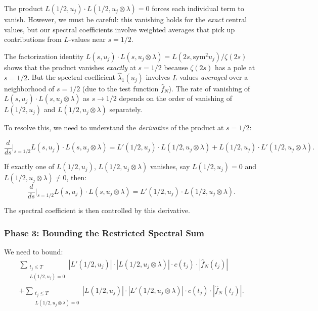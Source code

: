 \documentclass[11pt,a4paper]{article}
\theoremstyle{plain}
\theoremstyle{definition}
\newcommand{\sym}{\mathrm{sym}}
\begin{document}
The product $L(1/2, u_j) \cdot L(1/2, u_j \otimes \lambda) = 0$ forces each individual term to vanish. However, we must be careful: this vanishing holds for the \emph{exact} central values, but our spectral coefficients involve weighted averages that pick up contributions from $L$-values near $s = 1/2$.

\begin{obstacle}
The factorization identity $L(s, u_j) \cdot L(s, u_j \otimes \lambda) = L(2s, \sym^2 u_j)/\zeta(2s)$ shows that the product vanishes \emph{exactly} at $s = 1/2$ because $\zeta(2s)$ has a pole at $s = 1/2$. But the spectral coefficient $\hat{\lambda}_1(u_j)$ involves $L$-values \emph{averaged} over a neighborhood of $s = 1/2$ (due to the test function $\hat{f}_N$). The rate of vanishing of $L(s, u_j) \cdot L(s, u_j \otimes \lambda)$ as $s \to 1/2$ depends on the order of vanishing of $L(1/2, u_j)$ and $L(1/2, u_j \otimes \lambda)$ separately.
\end{obstacle}

To resolve this, we need to understand the \emph{derivative} of the product at $s = 1/2$:

\begin{equation}
\label{eq:derivative-product}
\frac{d}{ds}\bigg|_{s=1/2} L(s, u_j) \cdot L(s, u_j \otimes \lambda) = L'(1/2, u_j) \cdot L(1/2, u_j \otimes \lambda) + L(1/2, u_j) \cdot L'(1/2, u_j \otimes \lambda).
\end{equation}

If exactly one of $L(1/2, u_j)$, $L(1/2, u_j \otimes \lambda)$ vanishes, say $L(1/2, u_j) = 0$ and $L(1/2, u_j \otimes \lambda) \neq 0$, then:
\[
\frac{d}{ds}\bigg|_{s=1/2} L(s, u_j) \cdot L(s, u_j \otimes \lambda) = L'(1/2, u_j) \cdot L(1/2, u_j \otimes \lambda).
\]

The spectral coefficient is then controlled by this derivative.

\subsubsection{Phase 3: Bounding the Restricted Spectral Sum}

We need to bound:
\begin{multline}
\label{eq:restricted-sum}
\sum_{\substack{t_j \leq T \\ L(1/2, u_j) = 0}} |L'(1/2, u_j)| \cdot |L(1/2, u_j \otimes \lambda)| \cdot c(t_j) \cdot |\hat{f}_N(t_j)| \\ + \sum_{\substack{t_j \leq T \\ L(1/2, u_j \otimes \lambda) = 0}} |L(1/2, u_j)| \cdot |L'(1/2, u_j \otimes \lambda)| \cdot c(t_j) \cdot |\hat{f}_N(t_j)|.
\end{multline}
\end{document}
